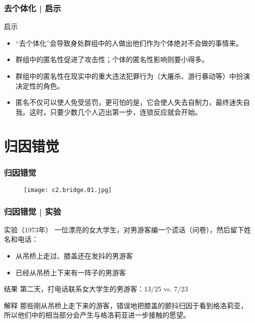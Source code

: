 \begin{frame}
  \frametitle{去个体化 | 启示}
  \begin{block}{启示}
    \begin{itemize}
      \item “去个体化”会导致身处群组中的人做出他们作为个体绝对不会做的事情来。
      \item 群组中的匿名性促进了攻击性；个体的匿名性影响则要小得多。
      \item 群组中的匿名性在现实中的重大违法犯罪行为（大屠杀、游行暴动等）中扮演决定性的角色。
      \item 匿名不仅可以使人免受惩罚，更可怕的是，它会使人失去自制力，最终迷失自我。这时，只要少数几个人迈出第一步，连锁反应就会开始。
    \end{itemize}
  \end{block}
\end{frame}

\section{归因错觉}
\begin{frame}
  \frametitle{归因错觉}
  \begin{figure}
    \centering
    \texttt{[image: c2.bridge.01.jpg]}
  \end{figure}
\end{frame}

\begin{frame}
  \frametitle{归因错觉 | 实验}
  \begin{block}{实验（1973年）}
    一位漂亮的女大学生，对男游客编一个谎话（问卷），然后留下姓名和电话：
    \begin{itemize}
      \item 从吊桥上走过、膝盖还在发抖的男游客
      \item 已经从吊桥上下来有一阵子的男游客
    \end{itemize}
  \end{block}
  \pause
  \begin{block}{结果}
    第二天，打电话联系女大学生的男游客：13/25 vs. 7/23
  \end{block}
  \pause
  \begin{block}{解释}
那些刚从吊桥上走下来的游客，错误地把膝盖的颤抖归因于看到格洛莉亚，所以他们中的相当部分会产生与格洛莉亚进一步接触的愿望。
  \end{block}
\end{frame}

